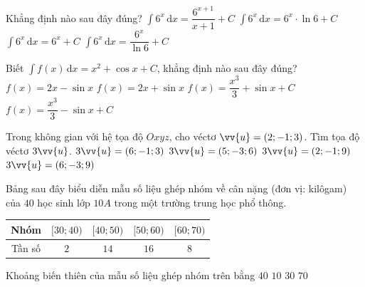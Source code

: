 \begin{ex}%
	Khẳng định nào sau đây đúng?
	\choice
	{$\displaystyle\int\limits 6^x \mathrm{\,d}x=\dfrac{6^{x+1}}{x+1}+C$}
	{$\displaystyle\int\limits 6^x \mathrm{\,d}x=6^x \cdot \ln 6+C$}
	{$\displaystyle\int\limits 6^x \mathrm{\,d}x=6^x+C$}
	{\True $\displaystyle\int\limits 6^x \mathrm{\,d}x=\dfrac{6^x}{\ln 6}+C$}
\end{ex}


\begin{ex}%
	Biết $\displaystyle\int f(x)\,\mathrm{d}x=x^2+\cos x+C$, khẳng định nào sau đây đúng?
	\choice
	{\True $f(x)=2x-\sin x$}
	{$f(x)=2x+\sin x$}
	{$f(x)=\dfrac{x^3}{3}+\sin x+C$}
	{$f(x)=\dfrac{x^3}{3}-\sin x+C$}
\end{ex}
\begin{ex}%
	Trong không gian với hệ tọa độ $Oxyz$, cho véctơ $\vv{u}=(2;-1;3)$. Tìm tọa độ véctơ $3\vv{u}$.
	\choice
	{$3\vv{u}=(6;-1;3)$}
	{$3\vv{u}=(5;-3;6)$}
	{$3\vv{u}=(2;-1;9)$}
	{\True $3\vv{u}=(6;-3;9)$}
\end{ex}%
\begin{ex}%
	Bảng sau đây biểu diễn mẫu số liệu ghép nhóm về cân nặng (đơn vị: kilôgam) của $40$ học sinh lớp $10A$ trong một trường trung học phổ thông.
	\begin{center}
		\begin{tabular}{|c|c|c|c|c|}
			\hline
			Nhóm&$[30;40)$&$[40;50)$&$[50;60)$&$[60;70)$\\
			\hline
			Tần số&$2$&$14$&$16$&$8$\\
			\hline
		\end{tabular}
	\end{center}
	Khoảng biến thiên của mẫu số liệu ghép nhóm trên bằng
	\choice
	{\True $40$}
	{$10$}
	{$30$}
	{$70$}
\end{ex}%
